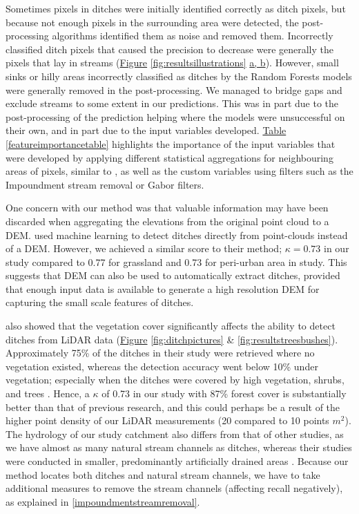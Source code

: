 \documentclass[]{interact}
\theoremstyle{plain}%
\theoremstyle{definition}
\theoremstyle{remark}
\begin{document}
Sometimes pixels in ditches were initially identified correctly as ditch pixels, but because not enough pixels in the surrounding area were detected, the post-processing algorithms identified them as noise and removed them. Incorrectly classified ditch pixels that caused the precision to decrease were generally the pixels that lay in streams (\hyperref[fig:resultsillustrations]{Figure} \ref{fig:resultsillustrations} \hyperref[fig:resultsillustrations]{a, b}). However, small sinks or hilly areas incorrectly classified as ditches by the Random Forests models were generally removed in the post-processing. We managed to bridge gaps and exclude streams to some extent in our predictions. This was in part due to the post-processing of the prediction helping where the models were unsuccessful on their own, and in part due to the input variables developed. \hyperref[featureimportancetable]{Table} \ref{featureimportancetable} highlights the importance of the input variables that were developed by applying different statistical aggregations for neighbouring areas of pixels, similar to \citet{roelens}, as well as the custom variables using filters such as the Impoundment stream removal or Gabor filters.

One concern with our method was that valuable information may have been discarded when aggregating the elevations from the original point cloud to a DEM. \citet{roelens} used  machine learning to detect ditches directly from point-clouds instead of a DEM. However, we achieved a similar score to their method; $\kappa=0.73$ in our study compared to 0.77 for grassland and 0.73 for peri-urban area in \citet{roelens} study. This suggests that DEM can also be used to automatically extract ditches, provided that enough input data is available to generate a high resolution DEM for capturing the small scale features of ditches. 

\citet{bailly} also showed that the vegetation cover significantly affects the ability to detect ditches from LiDAR data (\hyperref[fig:ditchpictures]{Figure} \ref{fig:ditchpictures} \& \ref{fig:resultstreesbushes}). Approximately 75\% of the ditches in their study were retrieved where no vegetation existed, whereas the detection accuracy went below 10\% under vegetation; especially when the ditches were covered by high vegetation, shrubs, and trees \citep{bailly}. Hence, a $\kappa$ of 0.73 in our study  with  87\% forest cover \citep{krycklancatchment} is substantially better than that of previous research, and this could perhaps be a result of the higher point density of our LiDAR measurements (20 compared to 10 points $m^{2}$). The hydrology of our study catchment also differs from that of other studies, as we have almost as many natural stream channels as ditches, whereas their studies were conducted in smaller, predominantly artificially drained areas \citep{bailly, roelens, rapinel}. Because our method locates both ditches and natural stream channels, we have to take additional measures to remove the stream channels (affecting recall negatively), as explained in \ref{impoundmentstreamremoval}.
\end{document}
